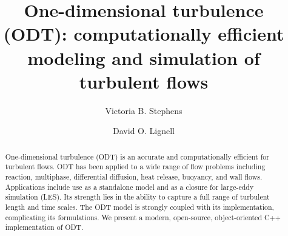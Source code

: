 \documentclass[preprint,12pt, a4paper]{elsarticle}
\begin{document}
\begin{frontmatter}



\title{One-dimensional turbulence (ODT): computationally efficient modeling and simulation of turbulent  flows}


\author{Victoria B. Stephens}
\author{David O. Lignell}


\address{Chemical Engineering Department, Brigham Young University, Provo, UT 84602, USA}

\begin{abstract}
%
    One-dimensional turbulence (ODT) is an accurate and computationally efficient   for   turbulent flows. ODT has been applied to a wide range of flow problems including reaction, multiphase, differential diffusion, heat release, buoyancy, and wall flows. Applications include use as a standalone model and as a closure for large-eddy simulation (LES). Its strength lies in the ability to capture a full range of turbulent length and time scales. The ODT model is strongly coupled with its implementation, complicating its formulations. We present a modern, open-source, object-oriented C++ implementation of ODT.  
%
\end{abstract}


\end{frontmatter}
\end{document}
